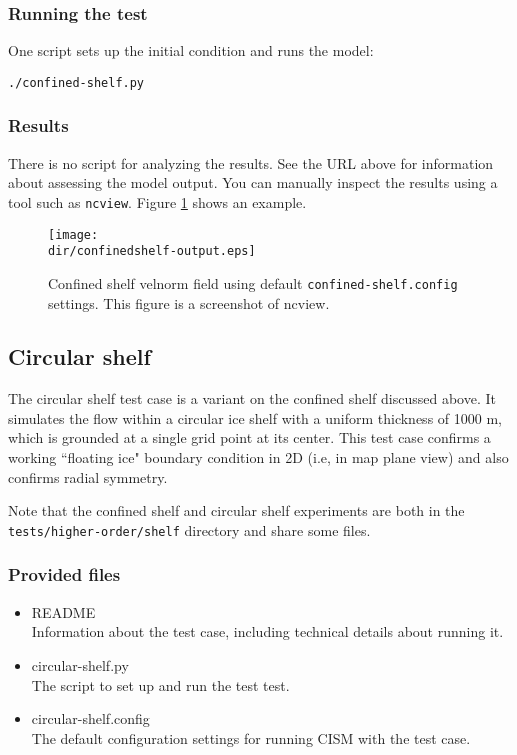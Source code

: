 \subsubsection{Running the test}
One script sets up the initial condition and runs the model:

\texttt{./confined-shelf.py}

\subsubsection{Results}
There is no script for analyzing the results.  See the URL above for information 
about assessing the model output.
You can manually inspect the results using a tool such as \texttt{ncview}.
Figure \ref{fig:confinedshelf-results} shows an example.

\begin{figure}[H!]
	\centering
	\texttt{[image: \\dir/confinedshelf-output.eps]}
	\caption{Confined shelf velnorm field using default \texttt{confined-shelf.config} settings. This figure is a screenshot of ncview.}
	\label{fig:confinedshelf-results}
\end{figure}
\FloatBarrier

\subsection{Circular shelf}
The circular shelf test case is a variant on the confined shelf discussed above. It simulates the flow within a circular ice shelf with a uniform thickness
of 1000 m, which is grounded at a single grid point at its center. This test case confirms a working ``floating ice" boundary condition
in 2D (i.e, in map plane view) and also confirms radial symmetry. 

Note that the confined shelf and circular shelf experiments are both in the 
\texttt{tests/higher-order/shelf} directory and share some files.

\subsubsection{Provided files}

\begin{itemize}
	\item README \\
		Information about the test case, including technical details about running it.
	\item circular-shelf.py \\
		The script to set up and run the test test.
	\item circular-shelf.config \\
          The default configuration settings for running CISM with the test case.
\end{itemize}

